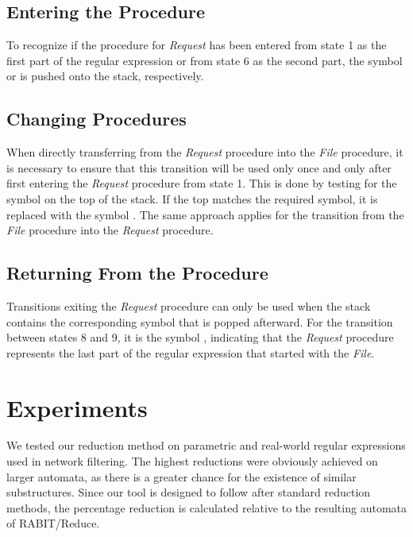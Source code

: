\documentclass{ExcelAtFIT}
\newcommand{\circledtext}[2][red]{%
    \tikz[baseline=(char.base)]{
        \node[shape=circle, draw, fill=#1, inner sep=0pt] (char) {\hspace*{0.15mm}\textbf{\textcolor{#1}{#2}}};}\hspace*{-1mm}
}
\begin{document}
	\subsection*{Entering the Procedure}
		To recognize if the procedure for \textit{Request} has been entered from state 1 as the first part of the regular expression or from state 6 as the second part, the symbol \circledtext[orange]{1} or \circledtext[black!20!green]{6} is pushed onto the stack, respectively.

	\subsection*{Changing Procedures}
		When directly transferring from the \textit{Request} procedure into the \textit{File} procedure, it is necessary to ensure that this transition will be used only once and only after first entering the \textit{Request} procedure from state 1. This is done by testing for the symbol \circledtext[orange]{1} on the top of the stack. If the top matches the required symbol, it is replaced with the symbol \circledtext[white!20!red]{5}. The same approach applies for the transition from the \textit{File} procedure into the \textit{Request} procedure.

	\subsection*{Returning From the Procedure}
		Transitions exiting the \textit{Request} procedure can only be used when the stack contains the corresponding symbol that is popped afterward. For the transition between states 8 and 9, it is the symbol \circledtext[black!20!green]{6}, indicating that the \textit{Request} procedure represents the last part of the regular expression that started with the \textit{File}.


\section{Experiments}
	We tested our reduction method on parametric and real-world regular expressions used in network filtering. The highest reductions were obviously achieved on larger automata, as there is a greater chance for the existence of similar substructures. Since our tool is designed to follow after standard reduction methods, the percentage reduction is calculated relative to the resulting automata of RABIT/Reduce.
\end{document}
